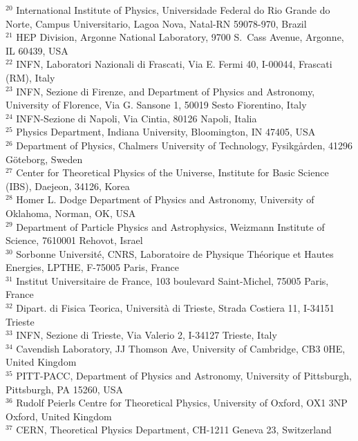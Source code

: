 {$^{20}$ International Institute of Physics, Universidade Federal do Rio Grande do Norte, Campus Universitario, Lagoa Nova, Natal-RN 59078-970, Brazil \\ 
$^{21}$ HEP Division, Argonne National Laboratory, 9700 S.~Cass Avenue, Argonne, IL 60439, USA \\ 
$^{22}$ INFN, Laboratori Nazionali di Frascati, Via E. Fermi 40, I-00044, Frascati (RM), Italy \\ 
$^{23}$ INFN, Sezione di Firenze, and Department of Physics and Astronomy, University of Florence, Via G. Sansone 1, 50019 Sesto Fiorentino, Italy \\ 
$^{24}$ INFN-Sezione di Napoli, Via Cintia, 80126 Napoli, Italia \\ 
$^{25}$ Physics Department, Indiana University, Bloomington, IN 47405, USA \\ 
$^{26}$ Department of Physics, Chalmers University of Technology, Fysikg\aa rden, 41296 G\"oteborg, Sweden \\ 
$^{27}$ Center for Theoretical Physics of the Universe, Institute for Basic Science (IBS), Daejeon, 34126, Korea \\ 
$^{28}$ Homer L. Dodge Department of Physics and Astronomy, University of Oklahoma, Norman, OK, USA \\ 
$^{29}$ Department of Particle Physics and Astrophysics, Weizmann Institute of Science, 7610001 Rehovot, Israel \\ 
$^{30}$ Sorbonne Universit\'e, CNRS, Laboratoire de Physique Th\'eorique et Hautes Energies, LPTHE, F-75005 Paris, France \\ 
$^{31}$ Institut Universitaire de France, 103 boulevard Saint-Michel, 75005 Paris, France \\ 
$^{32}$ Dipart. di Fisica Teorica, Universit\`a di Trieste, Strada Costiera 11, I-34151 Trieste \\ 
$^{33}$ INFN, Sezione di Trieste, Via Valerio 2, I-34127 Trieste, Italy \\ 
$^{34}$ Cavendish Laboratory, JJ Thomson Ave, University of Cambridge, CB3 0HE, United Kingdom \\ 
$^{35}$ PITT-PACC, Department of Physics and Astronomy, University of Pittsburgh, Pittsburgh, PA 15260, USA \\ 
$^{36}$ Rudolf Peierls Centre for Theoretical Physics, University of Oxford, OX1 3NP Oxford, United Kingdom \\ 
$^{37}$ CERN, Theoretical Physics Department, CH-1211 Geneva 23, Switzerland \\ 
}

